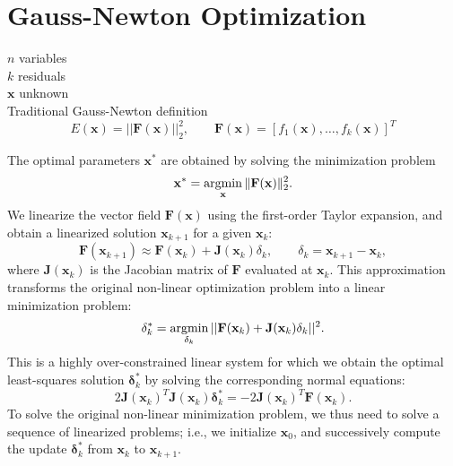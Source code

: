 \section{Gauss-Newton Optimization}
\label{sec:optimization}
$n$ variables\\
$k$ residuals\\
$\mathbf{x}$ unknown\\
Traditional Gauss-Newton definition
$$E (\mathbf{x}) = || \mathbf{F}(\mathbf{x}) ||_2^2,\qquad \mathbf{F}(\mathbf{x})  =[f_1(\mathbf{x}), \hdots, f_k(\mathbf{x})]^T$$



The optimal parameters $\mathbf{x}^{*}$ are obtained by solving the minimization problem
$$ \mathbf{x}^{*} = \displaystyle \operatorname*{argmin}_\mathbf{x} \Vert \mathbf{F} (\mathbf{x}) \Vert_2^2.$$
%
We linearize the vector field $\mathbf{F}(\mathbf{x})$ using the first-order Taylor expansion,
and obtain a linearized solution $\mathbf{x}_{k+1}$ for a given $\mathbf{x}_k$:
$$ \mathbf{F}(\mathbf{x}_{k+1}) \approx \mathbf{F}(\mathbf{x}_{k})+\mathbf{J}(\mathbf{x}_{k})\delta_k,\qquad \delta_k = \mathbf{x}_{k+1}-\mathbf{x}_{k},$$
where $\mathbf{J}(\mathbf{x}_k)$ is the Jacobian matrix of $\mathbf{F}$ evaluated at $\mathbf{x}_k$.
This approximation transforms the original non-linear optimization problem into a linear minimization problem:
$$
\mathbf{\delta}_{k}^{*}=\operatorname*{argmin}_{\mathbf{\delta}_{k}}{||\mathbf{F}(\mathbf{x}_{k})+\mathbf{J}(\mathbf{x}_{k})\mathbf{\delta}_{k}||^2}.
$$
This is a highly over-constrained linear system for which we obtain the optimal least-squares solution $\mathbf{\delta}_k^{*}$ by solving the corresponding normal equations:
$$
2 \mathbf{J}(\mathbf{x}_{k})^T\mathbf{J}(\mathbf{x}_{k})\mathbf{\delta}_{k}^{*} = - 2\mathbf{J}(\mathbf{x}_{k})^T\mathbf{F}(\mathbf{x}_{k}).
$$
To solve the original non-linear minimization problem, we thus need to solve a sequence of linearized problems;
i.e., we initialize $\mathbf{x}_0$, and successively compute the update $\mathbf{\delta}_k^{*}$ from $\mathbf{x}_k$ to $\mathbf{x}_{k+1}$.

